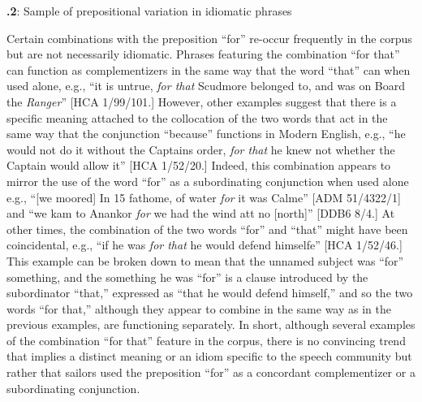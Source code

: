 \addtocounter{footnote}{-2}

\textbf{.2}: Sample of prepositional variation in idiomatic phrases

  Certain combinations with the preposition “for” re-occur frequently in the corpus but are not necessarily idiomatic. Phrases featuring the combination “for that” can function as complementizers in the same way that the word “that” can when used alone, e.g., “it is untrue, \textit{for that} Scudmore belonged to, and was on Board the \textit{Ranger}” [HCA 1/99/101.] However, other examples suggest that there is a specific meaning attached to the collocation of the two words that act in the same way that the conjunction “because” functions in Modern English, e.g., “he would not do it without the Captains order, \textit{for that} he knew not whether the Captain would allow it” [HCA 1/52/20.] Indeed, this combination appears to mirror the use of the word “for” as a subordinating conjunction when used alone e.g., “[we moored] In 15 fathome, of water \textit{for} it was Calme” [ADM 51/4322/1] and “we kam to Anankor \textit{for} we had the wind att no [north]” [DDB6 8/4.] At other times, the combination of the two words “for” and “that” might have been coincidental, e.g., “if he was \textit{for that} he would defend himselfe” [HCA 1/52/46.] This example can be broken down to mean that the unnamed subject was “for” something, and the something he was “for” is a clause introduced by the subordinator “that,” expressed as “that he would defend himself,” and so the two words “for that,” although they appear to combine in the same way as in the previous examples, are functioning separately. In short, although several examples of the combination “for that” feature in the corpus, there is no convincing trend that implies a distinct meaning or an idiom specific to the speech community but rather that sailors used the preposition “for” as a concordant complementizer or a subordinating conjunction. 


